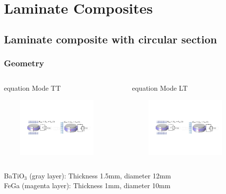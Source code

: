 \documentclass[compress]{beamer}
\begin{document}
\begin{frame}
\begin{columns}[totalwidth=\textwidth]
\begin{column}{.45\textwidth}
	\end{column}
	\end{columns}
\end{frame}

\section{Laminate Composites}
\subsection{Laminate composite with circular section}

\begin{frame}\frametitle{Geometry}
	
\begin{columns}[totalwidth=\textwidth]
   \begin{column}{.49\textwidth}
       \begin{beamercolorbox}[sep=8pt,center]{equation}
      Mode TT 
      \end{beamercolorbox}
\centering \includegraphics[height=3cm,width=0.9\textwidth]{Graphic/03_circuitTT.pdf}
   \end{column}
   \begin{column}{.49\textwidth}
       \begin{beamercolorbox}[sep=8pt,center]{equation}
      Mode LT 
      \end{beamercolorbox}
\centering \includegraphics[height=3cm,width=0.9\textwidth]{Graphic/03_circuitLT.pdf}
   \end{column}
\end{columns}
\centering
{\small
BaTiO$_3$ (gray layer): Thickness 1.5mm, diameter 12mm \\
FeGa (magenta layer): Thickness 1mm, diameter 10mm	
}
\vspace{0.3cm}

\end{frame}
\end{document}
